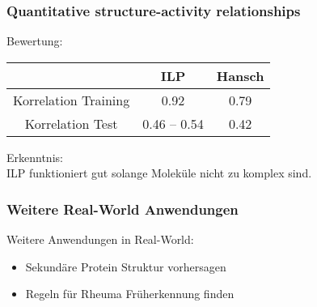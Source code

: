 \begin{frame}
	\frametitle{Quantitative structure-activity relationships}
	Bewertung:
	\begin{center}
		\begin{tabular}{|c|c|c|}
			\hline
			& ILP & Hansch\\
			\hline
			Korrelation Training & 0.92 & 0.79\\
			\hline
			Korrelation Test     & 0.46 -- 0.54 & 0.42\\
			\hline
		\end{tabular}
		\end{center}
		Erkenntnis:\\
		ILP funktioniert gut solange Moleküle nicht zu komplex sind.
\end{frame}

\begin{frame}
	\frametitle{Weitere Real-World Anwendungen}
	Weitere Anwendungen in Real-World:
	\begin{itemize}
		\item Sekundäre Protein Struktur vorhersagen
		\item Regeln für Rheuma Früherkennung finden
	\end{itemize}
\end{frame}
